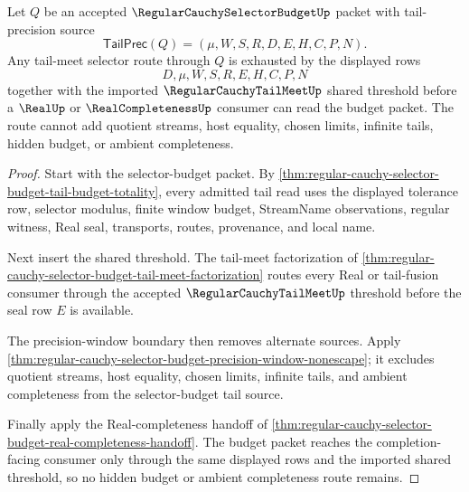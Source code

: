 \begin{theorem}
\label{thm:regular-cauchy-selector-budget-tail-meet-selector-exhaustion}
Let $Q$ be an accepted $\RegularCauchySelectorBudgetUp$ packet with tail-precision source
$$
\mathsf{TailPrec}(Q)=(\mu,W,S,R,D,E,H,C,P,N).
$$
Any tail-meet selector route through $Q$ is exhausted by the displayed rows
$$
D,\mu,W,S,R,E,H,C,P,N
$$
together with the imported $\RegularCauchyTailMeetUp$ shared threshold before a $\RealUp$ or $\RealCompletenessUp$ consumer can read the budget packet. The route cannot add quotient streams, host equality, chosen limits, infinite tails, hidden budget, or ambient completeness.
\end{theorem}
\begin{proof}
Start with the selector-budget packet. By \autoref{thm:regular-cauchy-selector-budget-tail-budget-totality}, every admitted tail read uses the displayed tolerance row, selector modulus, finite window budget, StreamName observations, regular witness, Real seal, transports, routes, provenance, and local name.

Next insert the shared threshold. The tail-meet factorization of \autoref{thm:regular-cauchy-selector-budget-tail-meet-factorization} routes every Real or tail-fusion consumer through the accepted $\RegularCauchyTailMeetUp$ threshold before the seal row $E$ is available.

The precision-window boundary then removes alternate sources. Apply \autoref{thm:regular-cauchy-selector-budget-precision-window-nonescape}; it excludes quotient streams, host equality, chosen limits, infinite tails, and ambient completeness from the selector-budget tail source.

Finally apply the Real-completeness handoff of \autoref{thm:regular-cauchy-selector-budget-real-completeness-handoff}. The budget packet reaches the completion-facing consumer only through the same displayed rows and the imported shared threshold, so no hidden budget or ambient completeness route remains.
\end{proof}

